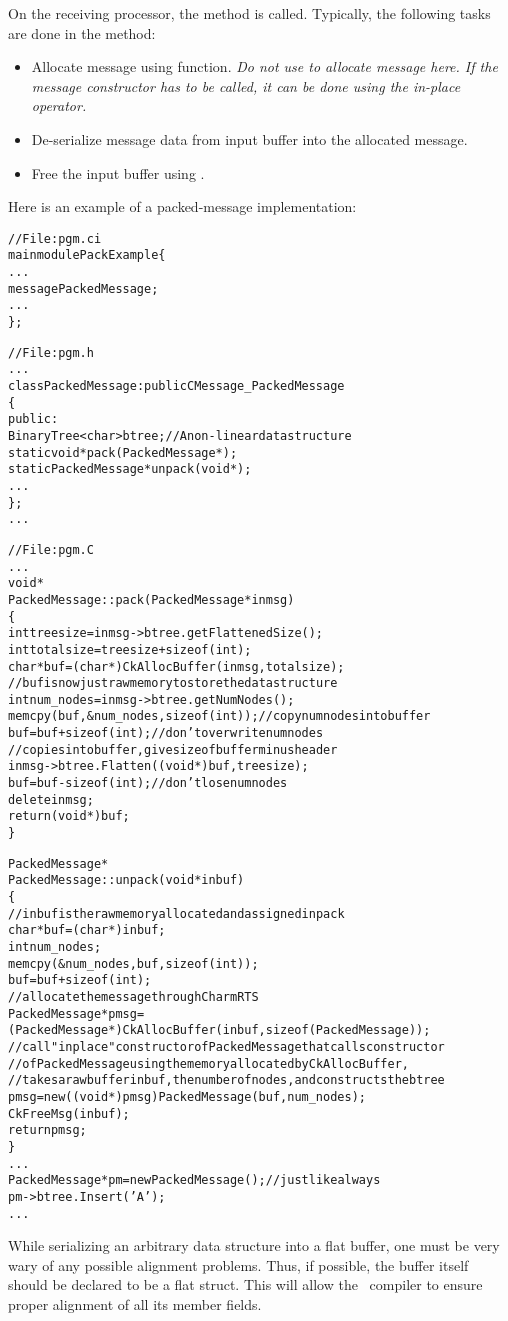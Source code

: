 On the receiving processor, the  method is called. Typically, the
following tasks are done in the  method:

\begin{itemize}

\item Allocate message using  function. {\em Do not
use  to allocate message here. If the message constructor has
to be called, it can be done using the in-place  operator.}

\item De-serialize message data from input buffer into the allocated message.

\item Free the input buffer using .

\end{itemize}

Here is an example of a packed-message implementation:

\begin{alltt}
// File: pgm.ci
mainmodule PackExample \{
  ...
  message PackedMessage;
  ...
\};

// File: pgm.h
...
class PackedMessage : public CMessage_PackedMessage
\{
  public:
    BinaryTree<char> btree; // A non-linear data structure 
    static void* pack(PackedMessage*);
    static PackedMessage* unpack(void*);
    ...
\};
...

// File: pgm.C
...
void*
PackedMessage::pack(PackedMessage* inmsg)
\{
  int treesize = inmsg->btree.getFlattenedSize();
  int totalsize = treesize + sizeof(int);
  char *buf = (char*)CkAllocBuffer(inmsg, totalsize);
  // buf is now just raw memory to store the data structure
  int num_nodes = inmsg->btree.getNumNodes();
  memcpy(buf, &num_nodes, sizeof(int));  // copy numnodes into buffer
  buf = buf + sizeof(int);               // don't overwrite numnodes
  // copies into buffer, give size of buffer minus header
  inmsg->btree.Flatten((void*)buf, treesize);    
  buf = buf - sizeof(int);              // don't lose numnodes
  delete inmsg;
  return (void*) buf;
\}

PackedMessage*
PackedMessage::unpack(void* inbuf)
\{
  // inbuf is the raw memory allocated and assigned in pack
  char* buf = (char*) inbuf;
  int num_nodes;
  memcpy(&num_nodes, buf, sizeof(int));
  buf = buf + sizeof(int);
  // allocate the message through Charm RTS
  PackedMessage* pmsg = 
    (PackedMessage*)CkAllocBuffer(inbuf, sizeof(PackedMessage));
  // call "inplace" constructor of PackedMessage that calls constructor
  // of PackedMessage using the memory allocated by CkAllocBuffer,
  // takes a raw buffer inbuf, the number of nodes, and constructs the btree
  pmsg = new ((void*)pmsg) PackedMessage(buf, num_nodes);  
  CkFreeMsg(inbuf);
  return pmsg;
\}
... 
PackedMessage* pm = new PackedMessage();  // just like always 
pm->btree.Insert('A');
...
\end{alltt}


While serializing an arbitrary data structure into a flat buffer, one must be
very wary of any possible alignment problems.  Thus, if possible, the buffer
itself should be declared to be a flat struct.  This will allow the \CC\
compiler to ensure proper alignment of all its member fields.

